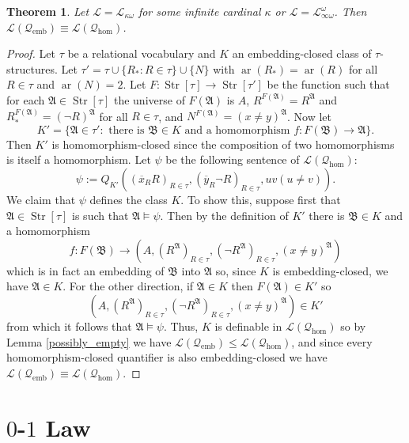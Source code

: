 \documentclass{ndjflart}
\theoremstyle{plain}
\newtheorem{theorem}[conjecture]{Theorem}
\theoremstyle{definition}
\numberwithin{equation}{section}
\DeclareMathOperator{\emb}{emb}
\DeclareMathOperator{\Str}{Str}
\DeclareMathOperator{\ar}{ar}
\begin{document}
\begin{theorem}
Let $\mathcal{L} = \mathcal{L}_{\kappa\omega}$ for some infinite cardinal $\kappa$ or $\mathcal{L} = \mathcal{L}_{\infty\omega}^{\omega}$.
Then $\mathcal{L}(\mathcal{Q}_{\emb}) \equiv \mathcal{L}(\mathcal{Q}_{\hom})$.
\end{theorem}
\begin{proof}
Let $\tau$ be a relational vocabulary and $K$ an embedding-closed class of $\tau$-structures.
Let $\tau' = \tau \cup \{R_* \colon R \in \tau \} \cup \{N\}$ with $\ar(R_*)= \ar(R)$ for all $R \in\tau$ and $\ar(N) = 2$.
Let $F \colon \Str[\tau] \rightarrow \Str[\tau']$ be the function such that for each $\mathfrak{A} \in \Str[\tau]$
the universe of $F(\mathfrak{A})$ is $A$, $R^{F(\mathfrak{A})} = R^{\mathfrak{A}}$ and $R_*^{F(\mathfrak{A})} = (\neg R)^{\mathfrak{A}}$ for all $R \in \tau$, and $N^{F(\mathfrak{A})} = (x\ne y)^{\mathfrak{A}}$.  
Now let
\[
	K' = \{\mathfrak{A}\in\tau' \colon \text{ there is } \mathfrak{B} \in K \text{ and a homomorphism }f \colon F(\mathfrak{B})\rightarrow \mathfrak{A} \}.
\]
Then $K'$ is homomorphism-closed since the composition of two homomorphisms is itself a homomorphism. 
Let $\psi$ be the following sentence of $\mathcal{L}(\mathcal{Q}_{\hom})$: 
\[
	\psi := Q_{K'}((\overline{x}_RR)_{R\in\tau},(\overline{y}_R\neg R)_{R\in\tau},uv(u\ne v)).
\] 
We claim that $\psi$ defines the class $K$. To show this, suppose first that $\mathfrak{A} \in \Str[\tau]$ is such that $\mathfrak{A}\vDash \psi$.
Then by the definition of $K'$ there is $\mathfrak{B} \in K$ and a homomorphism 
\[
	f \colon F(\mathfrak{B}) \rightarrow (A,(R^{\mathfrak{A}})_{R\in\tau},(\neg R^{\mathfrak{A}})_{R\in\tau},(x\ne y)^{\mathfrak{A}})
\]
which is in fact an embedding of $\mathfrak{B}$ into $\mathfrak{A}$ so,
since $K$ is embedding-closed, we have $\mathfrak{A} \in K$.
For the other direction, if $\mathfrak{A}\in K$ then $F(\mathfrak{A}) \in K'$ so
\[
	(A,(R^{\mathfrak{A}})_{R\in\tau},(\neg R^{\mathfrak{A}})_{R\in\tau},(x\ne y)^{\mathfrak{A}}) \in K'
\]
from which it follows that $\mathfrak{A} \vDash \psi$.
Thus, $K$ is definable in $\mathcal{L}(\mathcal{Q}_{\hom})$ so by Lemma \ref{possibly_empty} we have $\mathcal{L}(\mathcal{Q}_{\emb}) \leq \mathcal{L}(\mathcal{Q}_{\hom})$, and since every homomorphism-closed quantifier is also embedding-closed we have  $\mathcal{L}(\mathcal{Q}_{\emb}) \equiv \mathcal{L}(\mathcal{Q}_{\hom})$.
\end{proof}




\section{$0$-$1$ Law}\label{law}
\end{document}
